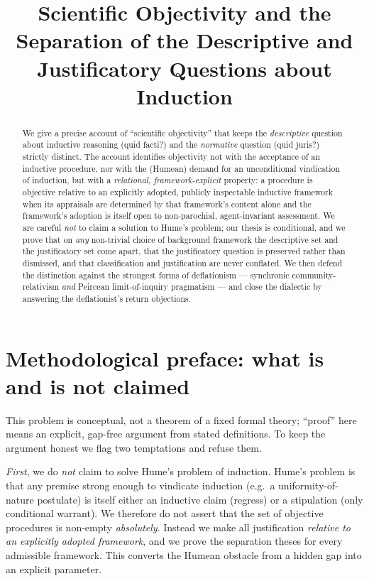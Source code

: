 \documentclass{amsart}
\theoremstyle{definition}
\theoremstyle{plain}
\theoremstyle{remark}
\begin{document}
\title{Scientific Objectivity and the Separation of the Descriptive and
Justificatory Questions about Induction}
\maketitle

\begin{abstract}
We give a precise account of ``scientific objectivity'' that keeps the
\emph{descriptive} question about inductive reasoning (quid facti?) and the
\emph{normative} question (quid juris?) strictly distinct. The account
identifies objectivity not with the acceptance of an inductive procedure, nor
with the (Humean) demand for an unconditional vindication of induction, but
with a \emph{relational, framework-explicit} property: a procedure is objective
relative to an explicitly adopted, publicly inspectable inductive framework
when its appraisals are determined by that framework's content alone and the
framework's adoption is itself open to non-parochial, agent-invariant
assessment. We are careful \emph{not} to claim a solution to Hume's problem;
our thesis is conditional, and we prove that on \emph{any} non-trivial choice
of background framework the descriptive set and the justificatory set come
apart, that the justificatory question is preserved rather than dismissed, and
that classification and justification are never conflated. We then defend the
distinction against the strongest forms of deflationism --- synchronic
community-relativism \emph{and} Peircean limit-of-inquiry pragmatism --- and
close the dialectic by answering the deflationist's return objections.
\end{abstract}

\section*{Methodological preface: what is and is not claimed}

This problem is conceptual, not a theorem of a fixed formal theory; ``proof''
here means an explicit, gap-free argument from stated definitions. To keep the
argument honest we flag two temptations and refuse them.

\emph{First}, we do \emph{not} claim to solve Hume's problem of induction.
Hume's problem is that any premise strong enough to vindicate induction (e.g.\
a uniformity-of-nature postulate) is itself either an inductive claim (regress)
or a stipulation (only conditional warrant). We therefore do not assert that
the set of objective procedures is non-empty \emph{absolutely}. Instead we make
all justification \emph{relative to an explicitly adopted framework}, and we
prove the separation theses for every admissible framework. This converts the
Humean obstacle from a hidden gap into an explicit parameter.
\end{document}

